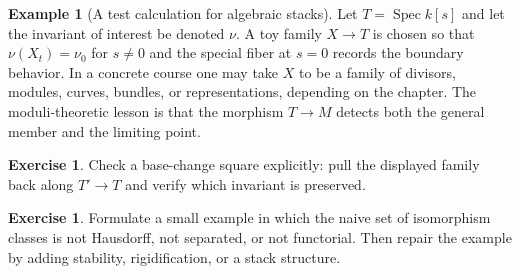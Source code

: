 \documentclass[11pt]{amsart}
\theoremstyle{definition}
\newtheorem{example}[theorem]{Example}
\newtheorem{exercise}[theorem]{Exercise}
\newcommand{\Spec}{\operatorname{Spec}}
\begin{document}
\begin{example}[A test calculation for algebraic stacks]
Let $T=\Spec k[s]$ and let the invariant of interest be denoted $\nu$.  A toy family $X\to T$ is chosen so that $\nu(X_t)=\nu_0$ for $s\ne0$ and the special fiber at $s=0$ records the boundary behavior.  In a concrete course one may take $X$ to be a family of divisors, modules, curves, bundles, or representations, depending on the chapter.  The moduli-theoretic lesson is that the morphism $T\to M$ detects both the general member and the limiting point.
\end{example}
\begin{exercise}
Check a base-change square explicitly: pull the displayed family back along $T\prime\to T$ and verify which invariant is preserved.
\end{exercise}
\begin{exercise}
Formulate a small example in which the naive set of isomorphism classes is not Hausdorff, not separated, or not functorial.  Then repair the example by adding stability, rigidification, or a stack structure.
\end{exercise}
\clearpage
\end{document}
